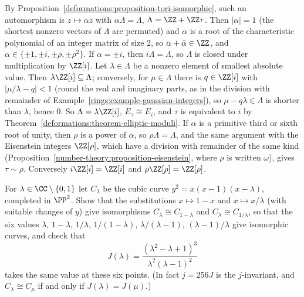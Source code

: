 \begin{solution}
By Proposition~\ref{deformations:proposition-tori-isomorphic}, such an automorphism is $z \mapsto \alpha z$ with $\alpha\Lambda = \Lambda$, $\Lambda = \ZZ + \ZZ\tau$. Then $|\alpha| = 1$ (the shortest nonzero vectors of $\Lambda$ are
permuted) and $\alpha$ is a root of the characteristic polynomial of an integer matrix of size $2$, so $\alpha + \bar\alpha \in \ZZ$, and $\alpha \in \{\pm1, \pm i, \pm\rho, \pm\rho^2\}$. If $\alpha = \pm i$, then
$i\Lambda = \Lambda$, so $\Lambda$ is closed under multiplication by $\ZZ[i]$. Let $\lambda \in \Lambda$ be a nonzero element of smallest absolute value. Then $\lambda\ZZ[i] \subseteq \Lambda$; conversely, for
$\mu \in \Lambda$ there is $q \in \ZZ[i]$ with $|\mu/\lambda - q| < 1$ (round the real and imaginary parts, as in the division with remainder of Example~\ref{rings:example-gaussian-integers}), so
$\mu - q\lambda \in \Lambda$ is shorter than $\lambda$, hence $0$. So $\Lambda = \lambda\ZZ[i]$, $E_\tau \cong E_i$, and $\tau$ is equivalent to $i$ by Theorem~\ref{deformations:theorem-elliptic-moduli}. If $\alpha$ is a
primitive third or sixth root of unity, then $\rho$ is a power of $\alpha$, so $\rho\Lambda = \Lambda$, and the same argument with the Eisenstein integers $\ZZ[\rho]$, which have a division with remainder
of the same kind (Proposition~\ref{number-theory:proposition-eisenstein}, where $\rho$ is written $\omega$), gives $\tau \sim \rho$. Conversely $i\ZZ[i] = \ZZ[i]$ and $\rho\ZZ[\rho] = \ZZ[\rho]$.
\end{solution}

\begin{exercise}\label{deformations:exercise-legendre-family}
For $\lambda \in \CC \setminus \{0, 1\}$ let $C_\lambda$ be the cubic curve $y^2 = x(x - 1)(x - \lambda)$, completed in $\PP^2$. Show that the substitutions $x \mapsto 1 - x$ and $x \mapsto x/\lambda$ (with suitable changes
of $y$) give isomorphisms $C_\lambda \cong C_{1 - \lambda}$ and $C_\lambda \cong C_{1/\lambda}$, so that the six values $\lambda$, $1 - \lambda$, $1/\lambda$, $1/(1 - \lambda)$, $\lambda/(\lambda - 1)$, $(\lambda - 1)/\lambda$
give isomorphic curves, and check that
\[
J(\lambda) = \frac{(\lambda^2 - \lambda + 1)^3}{\lambda^2(\lambda - 1)^2}
\]
takes the same value at these six points. (In fact $j = 256J$ is the $j$-invariant, and $C_\lambda \cong C_\mu$ if and only if $J(\lambda) = J(\mu)$.)
\end{exercise}

